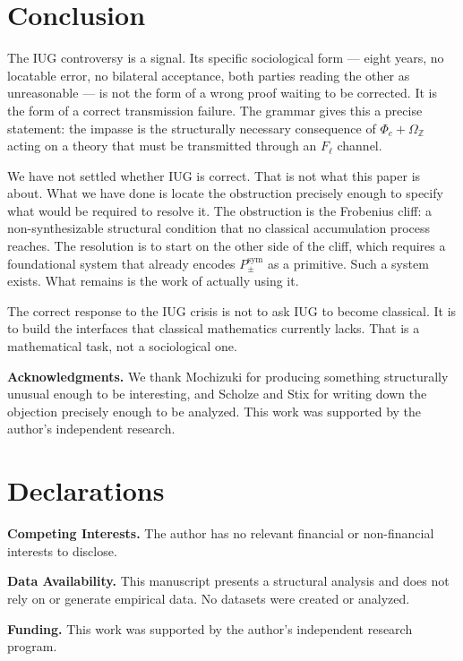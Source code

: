 \documentclass[12pt]{article}
\theoremstyle{plain}
\theoremstyle{definition}
\theoremstyle{remark}
\newcommand{\bZ}{\mathbb{Z}}
\begin{document}
\section*{Conclusion}

The IUG controversy is a signal. Its specific sociological form --- eight years, no
locatable error, no bilateral acceptance, both parties reading the other as unreasonable ---
is not the form of a wrong proof waiting to be corrected. It is the form of a correct
transmission failure. The grammar gives this a precise statement: the impasse is the
structurally necessary consequence of $\Phi_c + \Omega_\bZ$ acting on a theory that must
be transmitted through an $F_\ell$ channel.

We have not settled whether IUG is correct. That is not what this paper is about. What we
have done is locate the obstruction precisely enough to specify what would be required to
resolve it. The obstruction is the Frobenius cliff: a non-synthesizable structural condition
that no classical accumulation process reaches. The resolution is to start on the other
side of the cliff, which requires a foundational system that already encodes $P_\pm^\text{sym}$
as a primitive. Such a system exists. What remains is the work of actually using it.

The correct response to the IUG crisis is not to ask IUG to become classical. It is to
build the interfaces that classical mathematics currently lacks. That is a mathematical
task, not a sociological one.

\vspace{1em}
\noindent\textbf{Acknowledgments.}
We thank Mochizuki for producing something structurally unusual enough to be interesting,
and Scholze and Stix for writing down the objection precisely enough to be analyzed.
This work was supported by the author's independent research.

\section*{Declarations}

\noindent\textbf{Competing Interests.}
The author has no relevant financial or non-financial interests to disclose.

\noindent\textbf{Data Availability.}
This manuscript presents a structural analysis and does not rely on or generate empirical
data. No datasets were created or analyzed.

\noindent\textbf{Funding.}
This work was supported by the author's independent research program.
\end{document}
